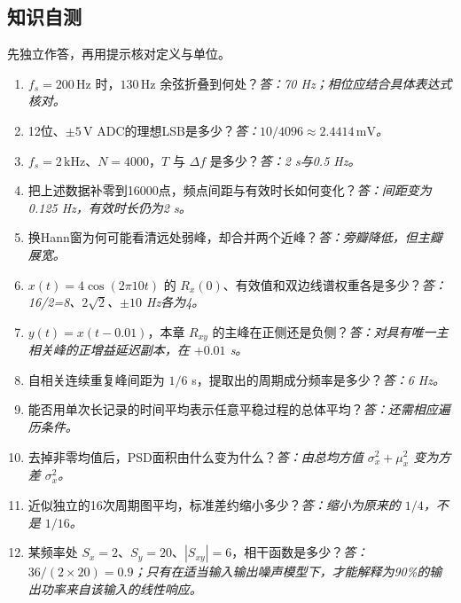 \subsection*{知识自测}
先独立作答，再用提示核对定义与单位。
\begin{enumerate}
\item $f_s=200\,\mathrm{Hz}$ 时，$130\,\mathrm{Hz}$ 余弦折叠到何处？\textit{答：70 Hz；相位应结合具体表达式核对。}
\item 12位、$\pm5\,\mathrm V$ ADC的理想LSB是多少？\textit{答：$10/4096\approx2.4414\,\mathrm{mV}$。}
\item $f_s=2\,\mathrm{kHz}$、$N=4000$，$T$ 与 $\Delta f$ 是多少？\textit{答：2 s与0.5 Hz。}
\item 把上述数据补零到16000点，频点间距与有效时长如何变化？\textit{答：间距变为0.125 Hz，有效时长仍为2 s。}
\item 换Hann窗为何可能看清远处弱峰，却合并两个近峰？\textit{答：旁瓣降低，但主瓣展宽。}
\item $x(t)=4\cos(2\pi10t)$ 的 $R_x(0)$、有效值和双边线谱权重各是多少？\textit{答：16/2=8、$2\sqrt2$、$\pm10$ Hz各为4。}
\item $y(t)=x(t-0.01)$，本章 $R_{xy}$ 的主峰在正侧还是负侧？\textit{答：对具有唯一主相关峰的正增益延迟副本，在 $+0.01$ s。}
\item 自相关连续重复峰间距为 $1/6$ s，提取出的周期成分频率是多少？\textit{答：6 Hz。}
\item 能否用单次长记录的时间平均表示任意平稳过程的总体平均？\textit{答：还需相应遍历条件。}
\item 去掉非零均值后，PSD面积由什么变为什么？\textit{答：由总均方值 $\sigma_x^2+\mu_x^2$ 变为方差 $\sigma_x^2$。}
\item 近似独立的16次周期图平均，标准差约缩小多少？\textit{答：缩小为原来的 $1/4$，不是 $1/16$。}
\item 某频率处 $S_x=2$、$S_y=20$、$|S_{xy}|=6$，相干函数是多少？\textit{答：$36/(2\times20)=0.9$；只有在适当输入输出噪声模型下，才能解释为90\%的输出功率来自该输入的线性响应。}
\end{enumerate}
